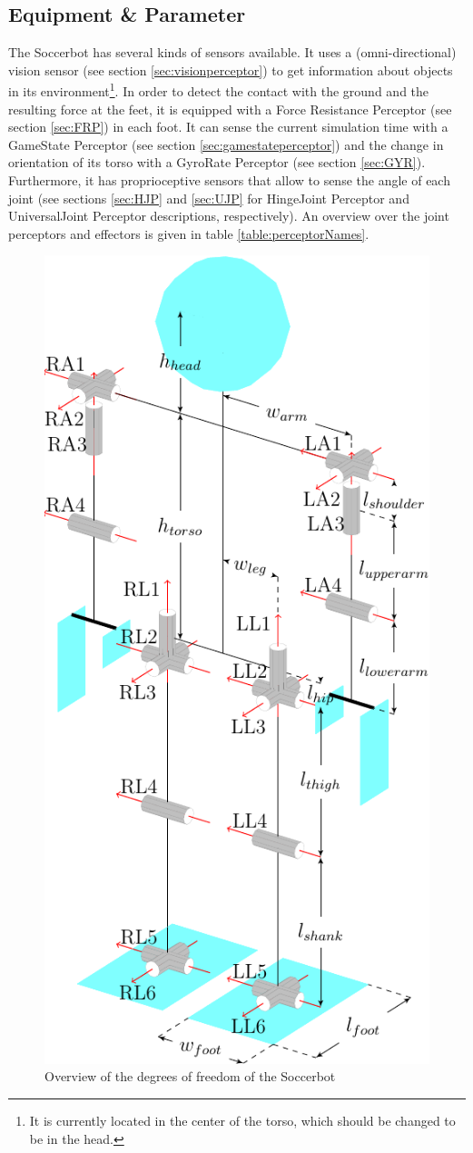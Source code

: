 \subsection{Equipment \& Parameter}
The Soccerbot has several kinds of sensors available. It uses a
(omni-directional) vision sensor (see section \ref{sec:visionperceptor}) to get
information about objects in its environment\footnote{It is currently located in
the center of the torso, which should be changed to be in the head.}. In order
to detect the contact with the ground and the resulting force at the feet, it is
equipped with a Force Resistance Perceptor (see section \ref{sec:FRP}) in each
foot. It can sense the current simulation time with a GameState Perceptor (see
section \ref{sec:gamestateperceptor}) and the change in orientation of its torso
with a GyroRate Perceptor (see section \ref{sec:GYR}). Furthermore, it has
proprioceptive sensors that allow to sense the angle of each joint (see sections
\ref{sec:HJP} and \ref{sec:UJP} for HingeJoint Perceptor and UniversalJoint
Perceptor descriptions, respectively). An overview over the joint perceptors and
effectors is given in table \ref{table:perceptorNames}.

\begin{figure}[htp]
  \centering
  \includegraphics[height=0.6\textwidth]{fig/soccerbot056}
  \caption{Overview of the degrees of freedom of the Soccerbot}
  \label{fig:soccerbotdof}
\end{figure}

